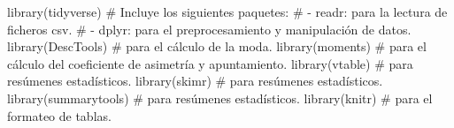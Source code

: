 \documentclass[
  spanish,
  a4paper,
]{scrreport}
\newenvironment{Shaded}{\begin{snugshade}}{\end{snugshade}}
\newcommand{\CommentTok}[1]{\textcolor[rgb]{0.37,0.37,0.37}{#1}}
\newcommand{\FunctionTok}[1]{\textcolor[rgb]{0.28,0.35,0.67}{#1}}
\newcommand{\NormalTok}[1]{\textcolor[rgb]{0.00,0.23,0.31}{#1}}
\theoremstyle{definition}
\theoremstyle{remark}
\begin{document}
\begin{Shaded}
\begin{Highlighting}[]
\FunctionTok{library}\NormalTok{(tidyverse) }
\CommentTok{\# Incluye los siguientes paquetes:}
\CommentTok{\# {-} readr: para la lectura de ficheros csv. }
\CommentTok{\# {-} dplyr: para el preprocesamiento y manipulación de datos.}
\FunctionTok{library}\NormalTok{(DescTools) }\CommentTok{\# para el cálculo de la moda.}
\FunctionTok{library}\NormalTok{(moments) }\CommentTok{\# para el cálculo del coeficiente de asimetría y apuntamiento.}
\FunctionTok{library}\NormalTok{(vtable) }\CommentTok{\# para resúmenes estadísticos.}
\FunctionTok{library}\NormalTok{(skimr) }\CommentTok{\# para resúmenes estadísticos.}
\FunctionTok{library}\NormalTok{(summarytools) }\CommentTok{\# para resúmenes estadísticos.}
\FunctionTok{library}\NormalTok{(knitr) }\CommentTok{\# para el formateo de tablas.}
\end{Highlighting}
\end{Shaded}
\end{document}
